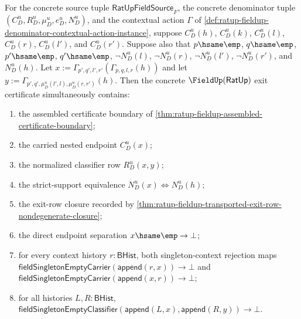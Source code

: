 \begin{theorem}
\label{thm:ratup-fieldup-normalized-contextual-full-noncollapse-package}
For the concrete source tuple $\mathsf{RatUpFieldSource}_F$, the concrete
denominator tuple $(C_D^u,R_D^u,\mu_D^u,e_D^u,N_D^u)$, and the contextual
action $\Gamma$ of
\autoref{def:ratup-fieldup-denominator-contextual-action-instance}, suppose
$C_D^u(h)$, $C_D^u(k)$, $C_D^u(l)$, $C_D^u(r)$, $C_D^u(l')$, and
$C_D^u(r')$. Suppose also that $p\hsame\emp$, $q\hsame\emp$, $p'\hsame\emp$,
$q'\hsame\emp$, $\neg N_D^u(l)$, $\neg N_D^u(r)$, $\neg N_D^u(l')$,
$\neg N_D^u(r')$, and $N_D^u(h)$. Let
$x:=\Gamma_{p',q',l',r'}(\Gamma_{p,q,l,r}(h))$ and let
$y:=\Gamma_{p',q',\mu_D^u(l',l),\mu_D^u(r,r')}(h)$. Then the concrete
$\FieldUp(\mathsf{RatUp})$ exit certificate simultaneously contains:
\begin{enumerate}
  \item the assembled certificate boundary of
  \autoref{thm:ratup-fieldup-assembled-certificate-boundary};
  \item the carried nested endpoint $C_D^u(x)$;
  \item the normalized classifier row $R_D^u(x,y)$;
  \item the strict-support equivalence $N_D^u(x)\Longleftrightarrow N_D^u(h)$;
  \item the exit-row closure recorded by
  \autoref{thm:ratup-fieldup-transported-exit-row-nondegenerate-closure};
  \item the direct endpoint separation $x\hsame\emp\to\bot$;
  \item for every context history $r:\mathsf{BHist}$, both singleton-context
  rejection maps
  $\mathsf{fieldSingletonEmptyCarrier}(\mathsf{append}(r,x))\to\bot$ and
  $\mathsf{fieldSingletonEmptyCarrier}(\mathsf{append}(x,r))\to\bot$;
  \item for all histories $L,R:\mathsf{BHist}$,
  $\mathsf{fieldSingletonEmptyClassifier}(\mathsf{append}(L,x),\mathsf{append}(R,y))
  \to\bot$.
\end{enumerate}
\end{theorem}
